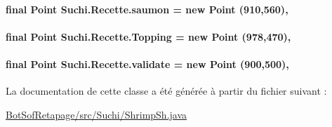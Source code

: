 \paragraph[{saumon}]{\setlength{\rightskip}{0pt plus 5cm}final Point Suchi.\+Recette.\+saumon = new Point (910,560)\hspace{0.3cm}{\ttfamily [protected]}, {\ttfamily [inherited]}}\label{classSuchi_1_1Recette_a17aeabd21e3d4d55d7caae9a40bfc6a1}
\hypertarget{classSuchi_1_1Recette_a4810b2254c050209fba27757066668b3}{}
\paragraph[{Topping}]{\setlength{\rightskip}{0pt plus 5cm}final Point Suchi.\+Recette.\+Topping = new Point (978,470)\hspace{0.3cm}{\ttfamily [protected]}, {\ttfamily [inherited]}}\label{classSuchi_1_1Recette_a4810b2254c050209fba27757066668b3}
\hypertarget{classSuchi_1_1Recette_aff16265c9b0b819091af71f64ef84be7}{}
\paragraph[{validate}]{\setlength{\rightskip}{0pt plus 5cm}final Point Suchi.\+Recette.\+validate = new Point (900,500)\hspace{0.3cm}{\ttfamily [protected]}, {\ttfamily [inherited]}}\label{classSuchi_1_1Recette_aff16265c9b0b819091af71f64ef84be7}


La documentation de cette classe a été générée à partir du fichier suivant \+:\begin{DoxyCompactItemize}
\item 
\hyperlink{BotSofRetapage_2src_2Suchi_2ShrimpSh_8java}{Bot\+Sof\+Retapage/src/\+Suchi/\+Shrimp\+Sh.\+java}\end{DoxyCompactItemize}
